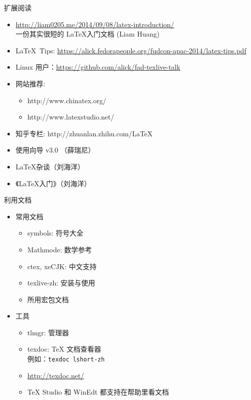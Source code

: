 \begin{frame}{扩展阅读}
  \begin{itemize}
    \item \url{http://liam0205.me/2014/09/08/latex-introduction/} \\
      一份其实很短的 \LaTeX 入门文档 (Liam Huang)
    \item \LaTeX\ Tips:
      \url{https://alick.fedorapeople.org/fudcon-apac-2014/latex-tips.pdf}
    \item Linux 用户：\url{https://github.com/alick/fad-texlive-talk}
  \item 网站推荐: 
      \begin{itemize}
        \item http://www.chinatex.org/
        \item http://www.latexstudio.net/
      \end{itemize}
    \item 知乎专栏: http://zhuanlan.zhihu.com/LaTeX
    \item \ThuThesis{}使用向导 v3.0 （薛瑞尼）
    \item \LaTeX{}杂谈（刘海洋）
    \item 《\LaTeX{}入门》（刘海洋）
  \end{itemize}
\end{frame}


\begin{frame}{利用文档}
	\begin{itemize}
		\item 常用文档
			\begin{itemize}
				\item symbols: 符号大全
				\item Mathmode: 数学参考
				\item ctex, xeCJK: 中文支持
				\item texlive-zh: \TL 安装与使用
				\item 所用宏包文档
			\end{itemize}
		\item 工具
			\begin{itemize}
				\item tlmgr: \TL 管理器
				\item texdoc: \TeX{} 文档查看器\\
					例如：\texttt{texdoc lshort-zh}
        \item \url{http://texdoc.net/}
        \item TeX Studio 和 WinEdt 都支持在帮助里看文档
			\end{itemize}
	\end{itemize}
\end{frame}

